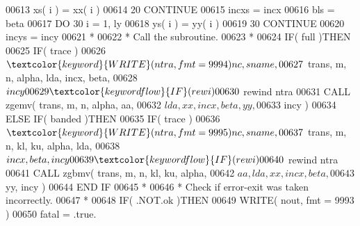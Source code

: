 \begin{DoxyCode}
00613                                  xs( i ) = xx( i )
00614    20                         \textcolor{keywordflow}{CONTINUE}
00615                               incxs = incx
00616                               bls = beta
00617                               \textcolor{keywordflow}{DO} 30 i = 1, ly
00618                                  ys( i ) = yy( i )
00619    30                         \textcolor{keywordflow}{CONTINUE}
00620                               incys = incy
00621 \textcolor{comment}{*}
00622 \textcolor{comment}{*                             Call the subroutine.}
00623 \textcolor{comment}{*}
00624                               \textcolor{keywordflow}{IF}( full )\textcolor{keywordflow}{THEN}
00625                                  \textcolor{keywordflow}{IF}( trace )
00626      $                              \textcolor{keyword}{WRITE}( ntra, fmt = 9994 )nc, sname,
00627      $                              trans, m, n, alpha, lda, incx, beta,
00628      $                              incy
00629                                  \textcolor{keywordflow}{IF}( rewi )
00630      $                              rewind ntra
00631                                  \textcolor{keyword}{CALL }zgemv( trans, m, n, alpha, aa,
00632      $                                       lda, xx, incx, beta, yy,
00633      $                                       incy )
00634                               \textcolor{keywordflow}{ELSE} \textcolor{keywordflow}{IF}( banded )\textcolor{keywordflow}{THEN}
00635                                  \textcolor{keywordflow}{IF}( trace )
00636      $                              \textcolor{keyword}{WRITE}( ntra, fmt = 9995 )nc, sname,
00637      $                              trans, m, n, kl, ku, alpha, lda,
00638      $                              incx, beta, incy
00639                                  \textcolor{keywordflow}{IF}( rewi )
00640      $                              rewind ntra
00641                                  \textcolor{keyword}{CALL }zgbmv( trans, m, n, kl, ku, alpha,
00642      $                                       aa, lda, xx, incx, beta,
00643      $                                       yy, incy )
00644 \textcolor{keywordflow}{                              END IF}
00645 \textcolor{comment}{*}
00646 \textcolor{comment}{*                             Check if error-exit was taken incorrectly.}
00647 \textcolor{comment}{*}
00648                               \textcolor{keywordflow}{IF}( .NOT.ok )\textcolor{keywordflow}{THEN}
00649                                  \textcolor{keyword}{WRITE}( nout, fmt = 9993 )
00650                                  fatal = .true.

\end{DoxyCode}

